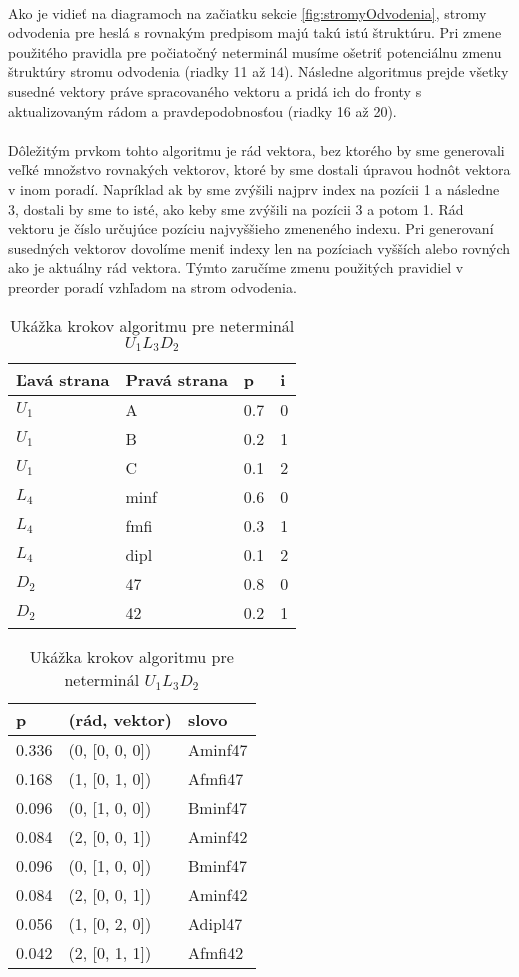 \paragraph{}
Ako je vidieť na diagramoch na začiatku sekcie \ref{fig:stromyOdvodenia}, stromy odvodenia pre heslá s rovnakým predpisom majú takú istú štruktúru. Pri zmene použitého pravidla pre počiatočný neterminál musíme ošetriť potenciálnu zmenu štruktúry stromu odvodenia (riadky 11 až 14). Následne algoritmus prejde všetky susedné vektory práve spracovaného vektoru a pridá ich do fronty s aktualizovaným rádom a pravdepodobnosťou (riadky 16 až 20).

\paragraph{}
Dôležitým prvkom tohto algoritmu je rád vektora, bez ktorého by sme generovali veľké množstvo rovnakých vektorov, ktoré by sme dostali úpravou hodnôt vektora v inom poradí. Napríklad ak by sme zvýšili najprv index na pozícii 1 a následne 3, dostali by sme to isté, ako keby sme zvýšili na pozícii 3 a potom 1. Rád vektoru je číslo určujúce pozíciu najvyššieho zmeneného indexu. Pri generovaní susedných vektorov dovolíme meniť indexy len na pozíciach vyšších alebo rovných ako je aktuálny rád vektora. Týmto zaručíme zmenu použitých pravidiel v preorder poradí vzhľadom na strom odvodenia.

\begin{table}[]
\centering
\caption{Ukážka krokov algoritmu pre neterminál \(U_1L_3D_2\)}
\label{postupAlgoritmu}
\begin{tabular}{l|lll}
Ľavá strana & Pravá strana & p & i \\ \hline
\(U_1\) & A & 0.7 & 0 \\
\(U_1\) & B & 0.2 & 1 \\
\(U_1\) & C & 0.1 & 2 \\
\(L_4\) & minf & 0.6 & 0 \\
\(L_4\) & fmfi & 0.3 & 1 \\
\(L_4\) & dipl & 0.1 & 2 \\
\(D_2\) & 47 & 0.8 & 0 \\
\(D_2\) & 42 & 0.2 & 1 \\
\end{tabular}
\quad
\begin{tabular}{lll}
p & (rád, vektor) & slovo \\ \hline
0.336 & (0, [0, 0, 0]) & Aminf47 \\ \hline \hline
0.168 & (1, [0, 1, 0]) & Afmfi47 \\
0.096 & (0, [1, 0, 0]) & Bminf47 \\
0.084 & (2, [0, 0, 1]) & Aminf42 \\ \hline \hline
0.096 & (0, [1, 0, 0]) & Bminf47 \\
0.084 & (2, [0, 0, 1]) & Aminf42 \\
0.056 & (1, [0, 2, 0]) & Adipl47 \\
0.042 & (2, [0, 1, 1]) & Afmfi42
\end{tabular}
\end{table}

